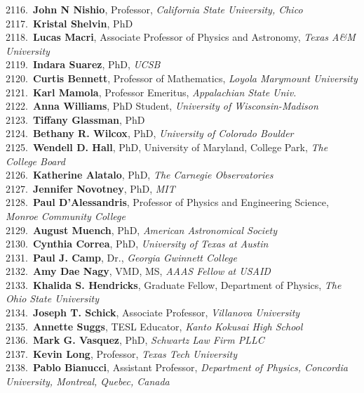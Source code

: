 2116.~{\bf John N Nishio}, Professor, {\sl California State University, Chico } \\
2117.~{\bf Kristal Shelvin}, PhD \\
2118.~{\bf Lucas Macri}, Associate Professor of Physics and Astronomy, {\sl Texas A\&M University} \\
2119.~{\bf Indara Suarez}, PhD, {\sl UCSB} \\
2120.~{\bf Curtis Bennett}, Professor of Mathematics, {\sl Loyola Marymount University} \\
2121.~{\bf Karl Mamola}, Professor Emeritus, {\sl Appalachian State Univ.} \\
2122.~{\bf Anna Williams}, PhD Student, {\sl University of Wisconsin-Madison} \\
2123.~{\bf Tiffany Glassman}, PhD \\
2124.~{\bf Bethany R. Wilcox}, PhD, {\sl University of Colorado Boulder} \\
2125.~{\bf Wendell D. Hall}, PhD, University of Maryland, College Park, {\sl The College Board} \\
2126.~{\bf Katherine Alatalo}, PhD, {\sl The Carnegie Observatories} \\
2127.~{\bf Jennifer Novotney}, PhD, {\sl MIT} \\
2128.~{\bf Paul D'Alessandris}, Professor of Physics and Engineering Science, {\sl Monroe Community College} \\
2129.~{\bf August Muench}, PhD, {\sl American Astronomical Society} \\
2130.~{\bf Cynthia Correa}, PhD, {\sl University of Texas at Austin} \\
2131.~{\bf Paul J. Camp}, Dr., {\sl Georgia Gwinnett College} \\
2132.~{\bf Amy Dae Nagy}, VMD, MS, {\sl AAAS Fellow at USAID} \\
2133.~{\bf Khalida S. Hendricks}, Graduate Fellow, Department of Physics, {\sl The Ohio State University} \\
2134.~{\bf Joseph T. Schick}, Associate Professor, {\sl Villanova University} \\
2135.~{\bf Annette Suggs}, TESL Educator, {\sl Kanto Kokusai High School } \\
2136.~{\bf Mark G. Vasquez}, PhD, {\sl Schwartz Law Firm PLLC} \\
2137.~{\bf Kevin Long}, Professor, {\sl Texas Tech University} \\
2138.~{\bf Pablo Bianucci}, Assistant Professor, {\sl Department of Physics, Concordia University, Montreal, Quebec, Canada} \\
